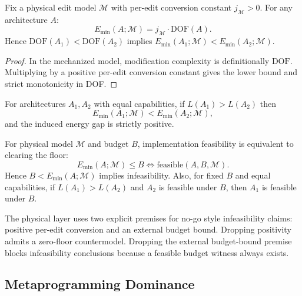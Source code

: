 \begin{theorem}\label{thm:physical-energy-floor}
Fix a physical edit model $\mathcal{M}$ with per-edit conversion constant $j_{\mathcal{M}}>0$. For any architecture $A$:
\[
E_{\min}(A;\mathcal{M}) = j_{\mathcal{M}}\cdot \mathrm{DOF}(A).
\]
Hence $\mathrm{DOF}(A_1) < \mathrm{DOF}(A_2)$ implies
$E_{\min}(A_1;\mathcal{M}) < E_{\min}(A_2;\mathcal{M})$.
\end{theorem}

\begin{proof}
In the mechanized model, modification complexity is definitionally $\mathrm{DOF}$. Multiplying by a positive per-edit conversion constant gives the lower bound and strict monotonicity in DOF.
\end{proof}

\begin{corollary}\label{cor:leverage-energy}
For architectures $A_1,A_2$ with equal capabilities, if $L(A_1)>L(A_2)$ then
\[
E_{\min}(A_1;\mathcal{M}) < E_{\min}(A_2;\mathcal{M}),
\]
and the induced energy gap is strictly positive.
\end{corollary}

\begin{theorem}\label{thm:physical-budget-boundary}
For physical model $\mathcal{M}$ and budget $B$, implementation feasibility is equivalent to clearing the floor:
\[
E_{\min}(A;\mathcal{M}) \le B \iff \text{feasible}(A,B,\mathcal{M}).
\]
Hence $B < E_{\min}(A;\mathcal{M})$ implies infeasibility. Also, for fixed $B$ and equal capabilities, if $L(A_1)>L(A_2)$ and $A_2$ is feasible under $B$, then $A_1$ is feasible under $B$.
\end{theorem}

\begin{corollary}\label{cor:physical-assumption-necessity}
The physical layer uses two explicit premises for no-go style infeasibility claims: positive per-edit conversion and an external budget bound. Dropping positivity admits a zero-floor countermodel. Dropping the external budget-bound premise blocks infeasibility conclusions because a feasible budget witness always exists.
\end{corollary}

\subsection{Metaprogramming Dominance}


